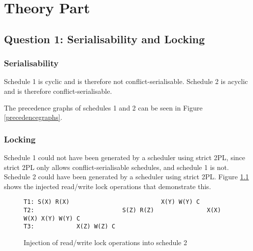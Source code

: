 \chapter{Theory Part}

\section{Question 1: Serialisability and Locking}

\subsection{Serialisability}
Schedule 1 is cyclic and is therefore not conflict-serialisable. Schedule 2 is acyclic and is therefore conflict-serialisable.

The precedence graphs of schedules 1 and 2 can be seen in Figure \ref{precedencegraphs}.


\subsection{Locking}

Schedule 1 could not have been generated by a scheduler using strict 2PL, since strict 2PL only allows conflict-serialisable schedules, and schedule 1 is not.
Schedule 2 could have been generated by a scheduler using strict 2PL. Figure \ref{schedule2strict2pl} shows the injected read/write lock operations that demonstrate this.

\begin{figure}
\begin{verbatim}
T1: S(X) R(X)                          X(Y) W(Y) C
T2:                         S(Z) R(Z)               X(X) W(X) X(Y) W(Y) C
T3:            X(Z) W(Z) C
\end{verbatim}
\caption{Injection of read/write lock operations into schedule 2\label{schedule2strict2pl}}
\end{figure}
